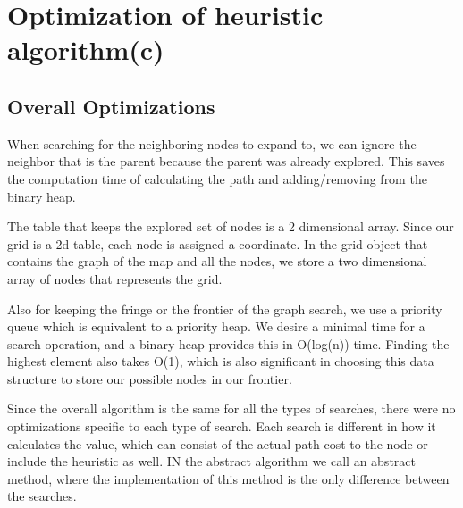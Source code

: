 \section{Optimization of heuristic algorithm(c)}

\subsection{Overall Optimizations}

When searching for the neighboring nodes to expand to, we can ignore the neighbor that is the parent because the parent was already explored. This saves the computation time of calculating the path and adding/removing from the binary heap.

The table that keeps the explored set of nodes is a 2 dimensional array. Since our grid is a 2d table, each node is assigned a coordinate. In the grid object that contains the graph of the map and all the nodes, we store a two dimensional array of nodes that represents the grid.

Also for keeping the fringe or the frontier of the graph search, we use a priority queue which is equivalent to a priority heap. We desire a minimal time for a search operation, and a binary heap provides this in O(log(n)) time. Finding the highest element also takes O(1), which is also significant in choosing this data structure to store our possible nodes in our frontier.

Since the overall algorithm is the same for all the types of searches, there were no optimizations specific to each type of search. Each search is different in how it calculates the value, which can consist of the actual path cost to the node or include the heuristic as well. IN the abstract algorithm we call an abstract method, where the implementation of this method is the only difference between the searches.